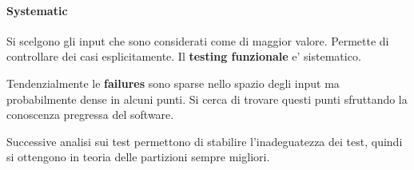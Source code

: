 \paragraph{Systematic}

Si scelgono gli input che sono considerati come di maggior valore. Permette di controllare dei casi esplicitamente.
Il \textbf{testing funzionale} e' sistematico.

Tendenzialmente le \textbf{failures} sono sparse nello spazio degli input ma probabilmente dense in alcuni punti. Si cerca di trovare questi punti sfruttando la conoscenza pregressa del software.

Successive analisi sui test permettono di stabilire l'inadeguatezza dei test, quindi si ottengono in teoria delle partizioni sempre migliori.
